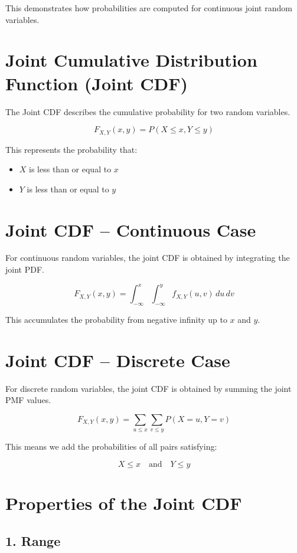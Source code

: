\documentclass[12pt]{article}
\begin{document}
This demonstrates how probabilities are computed for continuous joint random variables.

\section{Joint Cumulative Distribution Function (Joint CDF)}

The Joint CDF describes the cumulative probability for two random variables.

\[
F_{X,Y}(x,y)=P(X\le x, Y\le y)
\]

This represents the probability that:

\begin{itemize}
\item $X$ is less than or equal to $x$
\item $Y$ is less than or equal to $y$
\end{itemize}

\section{Joint CDF -- Continuous Case}

For continuous random variables, the joint CDF is obtained by integrating the joint PDF.

\[
F_{X,Y}(x,y)=\int_{-\infty}^{x}\int_{-\infty}^{y} f_{X,Y}(u,v)\,du\,dv
\]

This accumulates the probability from negative infinity up to $x$ and $y$.

\section{Joint CDF -- Discrete Case}

For discrete random variables, the joint CDF is obtained by summing the joint PMF values.

\[
F_{X,Y}(x,y)=\sum_{u\le x}\sum_{v\le y} P(X=u,Y=v)
\]

This means we add the probabilities of all pairs satisfying:

\[
X \le x \quad \text{and} \quad Y \le y
\]

\section{Properties of the Joint CDF}

\subsection{1. Range}
\end{document}
